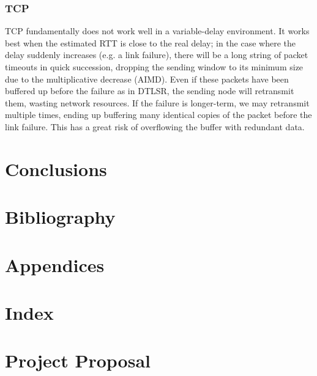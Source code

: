\documentclass[10pt,twoside,a4paper]{article}
\begin{document}
\pagebreak

\subsubsection{TCP}

TCP fundamentally does not work well in a variable-delay environment. It works best when the estimated RTT is close to the real delay; in the case where the delay suddenly increases (e.g. a link failure), there will be a long string of packet timeouts in quick succession, dropping the sending window to its minimum size due to the multiplicative decrease (AIMD). Even if these packets have been buffered up before the failure as in DTLSR, the sending node will retransmit them, wasting network resources. If the failure is longer-term, we may retransmit multiple times, ending up buffering many identical copies of the packet before the link failure. This has a great risk of overflowing the buffer with redundant data.






\section{Conclusions}

\section{Bibliography}

\section{Appendices}

\section{Index}

\section{Project Proposal}
\end{document}
